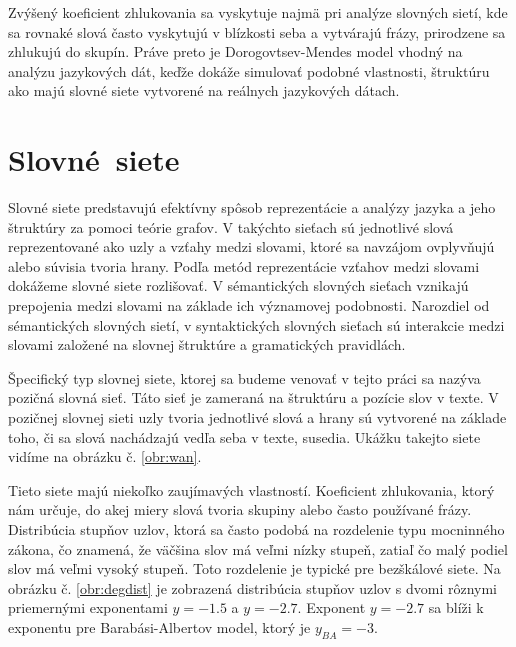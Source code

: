 Zvýšený koeficient zhlukovania sa vyskytuje najmä pri analýze slovných sietí, kde sa rovnaké slová často vyskytujú v blízkosti seba a vytvárajú frázy,
prirodzene sa zhlukujú do skupín. Práve preto je Dorogovtsev-Mendes model vhodný na analýzu jazykových dát, keďže dokáže simulovať podobné vlastnosti, štruktúru
ako majú slovné siete vytvorené na reálnych jazykových dátach. 

\section{Slovné~siete}\label{sec:word-networks}

Slovné siete predstavujú efektívny spôsob reprezentácie a analýzy jazyka a jeho štruktúry za pomoci teórie grafov.
V takýchto sieťach sú jednotlivé slová reprezentované ako uzly a vzťahy medzi slovami, ktoré sa navzájom ovplyvňujú alebo súvisia
tvoria hrany\cite{motter2002topology}. Podľa metód reprezentácie vzťahov medzi slovami dokážeme slovné siete rozlišovať.
V sémantických slovných sieťach vznikajú prepojenia medzi slovami na základe ich významovej podobnosti. Narozdiel od sémantických
slovných sietí, v syntaktických slovných sieťach sú interakcie medzi slovami založené na slovnej štruktúre a gramatických pravidlách.

Špecifický typ slovnej siete, ktorej sa budeme venovať v tejto práci sa nazýva pozičná slovná sieť. Táto sieť je zameraná na štruktúru
a pozície slov v texte. V pozičnej slovnej sieti uzly tvoria jednotlivé slová a hrany sú vytvorené na základe toho, či sa slová nachádzajú
vedľa seba v texte, susedia. Ukážku takejto siete vidíme na obrázku č. \ref{obr:wan}.

Tieto siete majú niekoľko zaujímavých vlastností. Koeficient zhlukovania, ktorý nám určuje, do akej
miery slová tvoria skupiny alebo často používané frázy. Distribúcia stupňov uzlov, ktorá sa často podobá na rozdelenie 
typu mocninného zákona, čo znamená, že väčšina slov má veľmi nízky stupeň, zatiaľ čo malý podiel slov má veľmi vysoký stupeň\cite{dorogovtsev2001language}.
Toto rozdelenie je typické pre bezškálové siete. Na obrázku č. \ref{obr:degdist} je zobrazená distribúcia stupňov uzlov s dvomi
rôznymi priemernými exponentami $y = -1.5$ a $y = -2.7$. Exponent $y = -2.7$ sa blíži k exponentu pre Barabási-Albertov model, ktorý je
$y_{BA} = -3$\cite{cancho2001small}.


